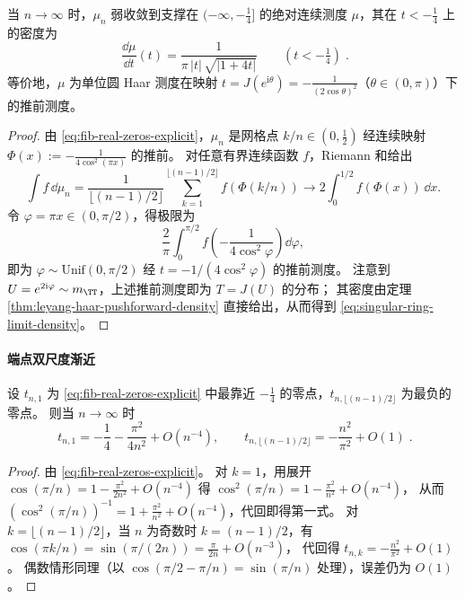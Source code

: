 \begin{proposition}[极限测度的显式密度]\label{prop:singular-ring-limit-measure-density}
当 \(n\to\infty\) 时，\(\mu_n\) 弱收敛到支撑在 \((-\infty,-\tfrac14]\) 的绝对连续测度 \(\mu\)，其在 \(t<-\tfrac14\) 上的密度为
\begin{equation}\label{eq:singular-ring-limit-density}
\boxed{\;
\frac{\dd\mu}{\dd t}(t)=\frac{1}{\pi\,|t|\,\sqrt{|1+4t|}}\qquad(t<-\tfrac14)\; }.
\end{equation}
等价地，\(\mu\) 为单位圆 Haar 测度在映射 \(t=J(e^{\mathrm{i}\theta})=-\frac{1}{(2\cos\theta)^2}\)（\(\theta\in(0,\pi)\)）下的推前测度。
\end{proposition}
\begin{proof}
由 \eqref{eq:fib-real-zeros-explicit}，\(\mu_n\) 是网格点 \(k/n\in(0,\tfrac12)\) 经连续映射
\(
\Phi(x):=-\frac{1}{4\cos^2(\pi x)}
\)
的推前。
对任意有界连续函数 \(f\)，Riemann 和给出
\[
\int f\,\dd\mu_n
=\frac{1}{\lfloor (n-1)/2\rfloor}\sum_{k=1}^{\lfloor (n-1)/2\rfloor} f(\Phi(k/n))
\longrightarrow
2\int_0^{1/2} f(\Phi(x))\,\dd x.
\]
令 \(\varphi=\pi x\in(0,\pi/2)\)，得极限为
\[
\frac{2}{\pi}\int_0^{\pi/2} f\!\left(-\frac{1}{4\cos^2\varphi}\right)\dd\varphi,
\]
即为 \(\varphi\sim\mathrm{Unif}(0,\pi/2)\) 经 \(t=-1/(4\cos^2\varphi)\) 的推前测度。
注意到 \(U=e^{2\mathrm{i}\varphi}\sim m_{\TT}\)，上述推前测度即为 \(T=J(U)\) 的分布；
其密度由定理 \ref{thm:leyang-haar-pushforward-density} 直接给出，从而得到 \eqref{eq:singular-ring-limit-density}。
\end{proof}

\paragraph{端点双尺度渐近}
\begin{lemma}[端点邻域的精确尺度]\label{lem:singular-ring-endpoint-asymptotics}
设 \(t_{n,1}\) 为 \eqref{eq:fib-real-zeros-explicit} 中最靠近 \(-\tfrac14\) 的零点，\(t_{n,\lfloor (n-1)/2\rfloor}\) 为最负的零点。
则当 \(n\to\infty\) 时
\begin{equation}\label{eq:singular-ring-endpoint-asymptotics}
\boxed{\;
t_{n,1}=-\frac14-\frac{\pi^2}{4n^2}+O(n^{-4}),
\qquad
t_{n,\lfloor (n-1)/2\rfloor}=-\frac{n^2}{\pi^2}+O(1)\; }.
\end{equation}
\end{lemma}
\begin{proof}
由 \eqref{eq:fib-real-zeros-explicit}。
对 \(k=1\)，用展开 \(\cos(\pi/n)=1-\frac{\pi^2}{2n^2}+O(n^{-4})\) 得
\(
\cos^2(\pi/n)=1-\frac{\pi^2}{n^2}+O(n^{-4})
\)，
从而
\(
(\cos^2(\pi/n))^{-1}=1+\frac{\pi^2}{n^2}+O(n^{-4})
\)，代回即得第一式。
对 \(k=\lfloor (n-1)/2\rfloor\)，当 \(n\) 为奇数时 \(k=(n-1)/2\)，有
\(
\cos(\pi k/n)=\sin(\pi/(2n))=\frac{\pi}{2n}+O(n^{-3})
\)，
代回得 \(t_{n,k}=-\frac{n^2}{\pi^2}+O(1)\)。
偶数情形同理（以 \(\cos(\pi/2-\pi/n)=\sin(\pi/n)\) 处理），误差仍为 \(O(1)\)。
\end{proof}

